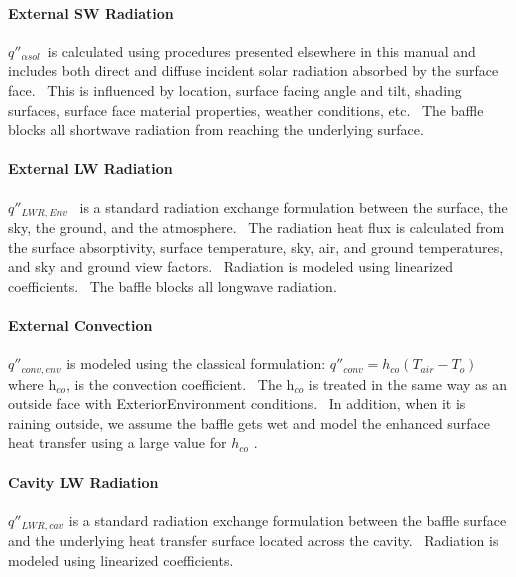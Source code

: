 \paragraph{External SW Radiation}\label{external-sw-radiation}

\(q''_{\alpha sol}\)~is calculated using procedures presented elsewhere in this manual and includes both direct and diffuse incident solar radiation absorbed by the surface face.~ This is influenced by location, surface facing angle and tilt, shading surfaces, surface face material properties, weather conditions, etc.~ The baffle blocks all shortwave radiation from reaching the underlying surface.

\paragraph{External LW Radiation}\label{external-lw-radiation}

\({q''_{LWR,Env}}\) ~is a standard radiation exchange formulation between the surface, the sky, the ground, and the atmosphere.~ The radiation heat flux is calculated from the surface absorptivity, surface temperature, sky, air, and ground temperatures, and sky and ground view factors.~ Radiation is modeled using linearized coefficients. ~The baffle blocks all longwave radiation.

\paragraph{External Convection}\label{external-convection}

\(q''_{conv,env}\) is modeled using the classical formulation: \(q''_{conv} = h_{co}(T_{air} - T_{o})\) where h\(_{co}\), is the convection coefficient.~ The h\(_{co}\) is treated in the same way as an outside face with ExteriorEnvironment conditions.~ In addition, when it is raining outside, we assume the baffle gets wet and model the enhanced surface heat transfer using a large value for \({h_{co}}\) .

\paragraph{Cavity LW Radiation}\label{cavity-lw-radiation}

\({q''_{LWR,cav}}\) is a standard radiation exchange formulation between the baffle surface and the underlying heat transfer surface located across the cavity.~ Radiation is modeled using linearized coefficients.

